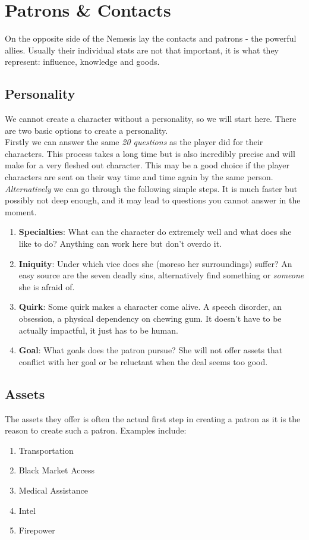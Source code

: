 \documentclass[12pt,a4paper,openany,usenames,dvipsnames]{book}
\begin{document}
	\chapter{Patrons \& Contacts}
	On the opposite side of the Nemesis lay the contacts and patrons - the powerful allies. Usually their individual stats are not that important, it is what they represent: influence, knowledge and goods.
	\section*{Personality}
	We cannot create a character without a personality, so we will start here. There are two basic options to create a personality.\\
	Firstly we can answer the same \emph{20 questions} as the player did for their characters. This process takes a long time but is also incredibly precise and will make for a very fleshed out character. This may be a good choice if the player characters are sent on their way time and time again by the same person.
	\emph{Alternatively} we can go through the following simple steps.
	It is much faster but possibly not deep enough, and it may lead to questions you cannot answer in the moment.
	\begin{enumerate}
		\setlength\itemsep{-8mm} \vspace{-8mm}
		\item \textbf{Specialties}: What can the character do extremely well and what does she like to do? Anything can work here but don't overdo it.
		\item \textbf{Iniquity}: Under which vice does she (moreso her surroundings) suffer? An easy source are the seven deadly sins, alternatively find something or \emph{someone} she is afraid of.
		\item \textbf{Quirk}: Some quirk makes a character come alive. A speech disorder, an obsession, a physical dependency on chewing gum. It doesn't have to be actually impactful, it just has to be human.
		\item \textbf{Goal}: What goals does the patron pursue? She will not offer assets that conflict with her goal or be reluctant when the deal seems too good.
	\end{enumerate}
	\section*{Assets}
	The assets they offer is often the actual first step in creating a patron as it is the reason to create such a patron. Examples include:
	\begin{enumerate}
		\setlength\itemsep{-8mm} \vspace{-8mm}
		\item Transportation
		\item Black Market Access
		\item Medical Assistance
		\item Intel
		\item Firepower
	\end{enumerate}
\end{document}
